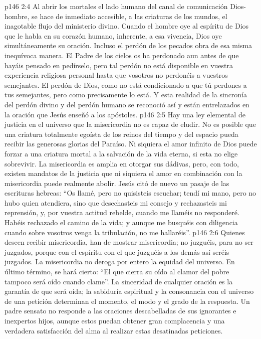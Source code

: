\vs p146 2:4 Al abrir los mortales el lado humano del canal de comunicación Dios\hyp{}hombre, se hace de inmediato accesible, a las criaturas de los mundos, el inagotable flujo del ministerio divino. Cuando el hombre oye al espíritu de Dios que le habla en su corazón humano, inherente, a esa vivencia, Dios oye simultáneamente su oración. Incluso el perdón de los pecados obra de esa misma inequívoca manera. El Padre de los cielos os ha perdonado aun antes de que hayáis pensado en pedírselo, pero tal perdón no está disponible en vuestra experiencia religiosa personal hasta que vosotros no perdonéis a vuestros semejantes. El perdón de Dios, como  no está condicionado a que tú perdones a tus semejantes, pero como  precisamente lo está. Y esta realidad de la sincronía del perdón divino y del perdón humano se reconoció así y están entrelazados en la oración que Jesús enseñó a los apóstoles.
\vs p146 2:5 Hay una ley elemental de justicia en el universo que la misericordia no es capaz de eludir. No es posible que una criatura totalmente egoísta de los reinos del tiempo y del espacio pueda recibir las generosas glorias del Paraíso. Ni siquiera el amor infinito de Dios puede forzar a una criatura mortal a la salvación de la vida eterna, si esta no elige sobrevivir. La misericordia es amplia en otorgar sus dádivas, pero, con todo, existen mandatos de la justicia que ni siquiera el amor en combinación con la misericordia puede realmente abolir. Jesús citó de nuevo un pasaje de las escrituras hebreas: “Os llamé, pero no quisisteis escuchar; tendí mi mano, pero no hubo quien atendiera, sino que desechasteis mi consejo y rechazasteis mi reprensión, y, por vuestra actitud rebelde, cuando me llaméis no responderé. Habéis rechazado el camino de la vida; y aunque me busquéis con diligencia cuando sobre vosotros venga la tribulación, no me hallaréis”.
\vs p146 2:6 Quienes deseen recibir misericordia, han de mostrar misericordia; no juzguéis, para no ser juzgados, porque con el espíritu con el que juzguéis a los demás así seréis juzgados. La misericordia no deroga por entero la equidad del universo. En último término, se hará cierto: “El que cierra su oído al clamor del pobre tampoco será oído cuando clame”. La sinceridad de cualquier oración es la garantía de que será oída; la sabiduría espiritual y la consonancia con el universo de una petición determinan el momento, el modo y el grado de la respuesta. Un padre sensato no responde  a las oraciones descabelladas de sus ignorantes e inexpertos hijos, aunque estos puedan obtener gran complacencia y una verdadera satisfacción del alma al realizar estas desatinadas peticiones.
